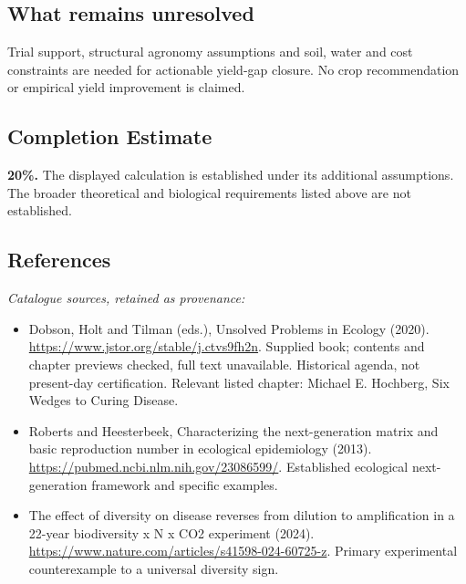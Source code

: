 \documentclass[11pt]{article}
\begin{document}
\subsection{What remains unresolved}
Trial support, structural agronomy assumptions and soil, water and cost constraints are needed for actionable yield-gap closure. No crop recommendation or empirical yield improvement is claimed.
\subsection{Completion Estimate}
\textbf{20\%.} The displayed calculation is established under its additional assumptions. The broader theoretical and biological requirements listed above are not established.
\subsection{References}
\noindent\emph{Catalogue sources, retained as provenance:}
\begin{itemize}
\item Dobson, Holt and Tilman (eds.), Unsolved Problems in Ecology (2020). \url{https://www.jstor.org/stable/j.ctvs9fh2n}. Supplied book; contents and chapter previews checked, full text unavailable. Historical agenda, not present-day certification. Relevant listed chapter: Michael E. Hochberg, Six Wedges to Curing Disease.
\item Roberts and Heesterbeek, Characterizing the next-generation matrix and basic reproduction number in ecological epidemiology (2013). \url{https://pubmed.ncbi.nlm.nih.gov/23086599/}. Established ecological next-generation framework and specific examples.
\item The effect of diversity on disease reverses from dilution to amplification in a 22-year biodiversity x N x CO2 experiment (2024). \url{https://www.nature.com/articles/s41598-024-60725-z}. Primary experimental counterexample to a universal diversity sign.
\end{itemize}
\clearpage


\appendix
\end{document}
